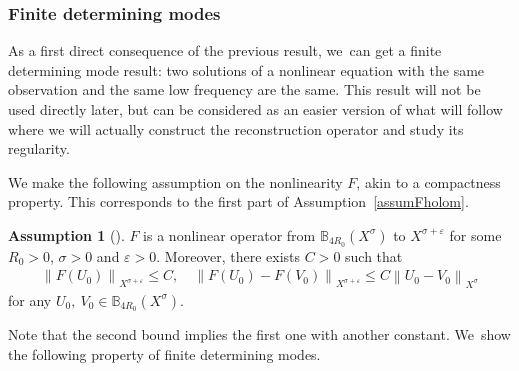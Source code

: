 \documentclass[10pt]{amsart}
\theoremstyle{definition}
\newtheorem{assum}{Assumption}
\newenvironment{assump}[2][]
{\renewcommand\theassum{#2}\begin{assum}[#1]}
{\end{assum}}
\let\veps\varepsilon
\newcommand\nor[2]{\left\|#1\right\|_{#2}}
\begin{document}
\subsubsection{Finite determining modes}
As a first direct consequence of the previous result, we~can get a finite determining mode result: two solutions of a nonlinear equation with the same observation and the same low frequency are the same. This result will not be used directly later, but can be considered as an easier version of what will follow where we will actually construct the reconstruction operator and study its regularity.

We make the following assumption on the nonlinearity $F$, akin to a compactness property. This corresponds to the first part of Assumption~\ref{assumFholom}.

\begin{assump}{3a}
\label{assumF}
$F$ is a nonlinear operator from $\mathbb{B}_{4R_{0}}(X^{\sigma})$ to $X^{\sigma+\veps}$ for some $R_{0}>0$, $\sigma>0$ and $\veps>0$. Moreover, there exists $C>0$ such that
\begin{align}
\label{boundF}
\nor{F(U_{0})}{X^{\sigma+\veps}}\leq C,\quad \nor{F(U_{0})-F(V_{0})}{X^{\sigma+\veps}}\leq C \nor{U_{0}-V_{0}}{X^{\sigma}}
\end{align}
for any $U_{0},~V_{0}\in \mathbb{B}_{4R_{0}}(X^{\sigma})$.
\end{assump}

Note that the second bound implies the first one with another constant. We~show the following property of finite determining modes.
\end{document}
